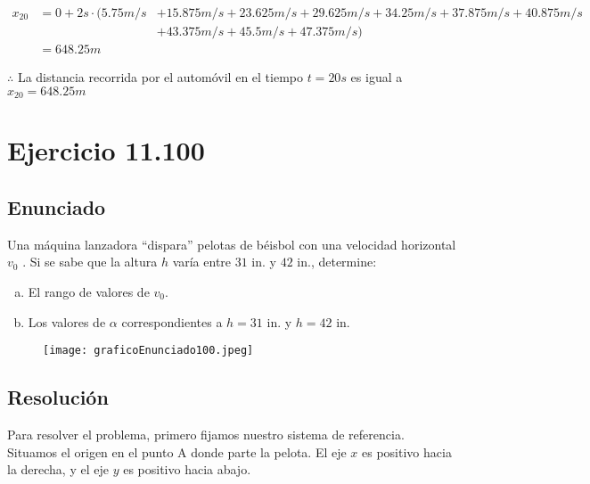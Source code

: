 \documentclass[11pt]{article}
\begin{document}
\begin{align*}
  x_{20} &= 0 + 2s \cdot (5.75 m/s &+ 15.875m/s + 23.625m/s + 29.625m/s + 34.25m/s + 37.875m/s + 40.875m/s \\
         &                         &+ 43.375m/s + 45.5m/s + 47.375m/s) \\
         &= 648.25m
\end{align*}

$\therefore$ La distancia recorrida por el automóvil en el tiempo $t = 20s$
es igual a $x_{20} = 648.25m$


\section*{Ejercicio 11.100}

\subsection*{Enunciado}

Una máquina lanzadora “dispara” pelotas de béisbol con una
velocidad horizontal $v_0$ . Si se sabe que la altura $h$ varía entre $31$ in. y $42$ in.,
determine:
\begin{enumerate}[a)]
  \item El rango de valores de $v_0$.
  \item Los valores de $\alpha$ correspondientes a $h = 31$ in. y $h = 42$ in.
\end{enumerate}

\begin{figure}[h!]
  \begin{center}
    \texttt{[image: graficoEnunciado100.jpeg]}
  \end{center}
\end{figure}


\subsection*{Resolución}

Para resolver el problema, primero fijamos nuestro sistema de referencia.
Situamos el origen en el punto A donde parte la pelota. El eje $x$ es positivo
hacia la derecha, y el eje $y$ es positivo hacia abajo. \\
\end{document}
